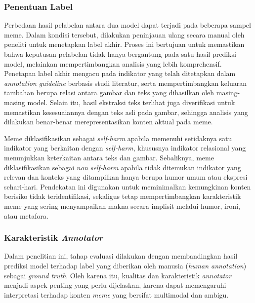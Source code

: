\subsubsection{Penentuan Label} \label{subsubsec:penentuan_label}
Perbedaan hasil pelabelan antara dua model dapat terjadi pada beberapa sampel meme. Dalam kondisi tersebut, dilakukan peninjauan ulang secara manual oleh peneliti untuk menetapkan label akhir. Proses ini bertujuan untuk memastikan bahwa keputusan pelabelan tidak hanya bergantung pada satu hasil prediksi model, melainkan mempertimbangkan analisis yang lebih komprehensif. Penetapan label akhir mengacu pada indikator yang telah ditetapkan dalam \textit{annotation guideline} berbasis studi literatur, serta mempertimbangkan keluaran tambahan berupa relasi antara gambar dan teks yang dihasilkan oleh masing-masing model. Selain itu, hasil ekstraksi teks terlihat juga diverifikasi untuk memastikan kesesuaiannya dengan teks asli pada gambar, sehingga analisis yang dilakukan benar-benar merepresentasikan konten aktual pada meme.

Meme diklasifikasikan sebagai \textit{self-harm} apabila memenuhi setidaknya satu indikator yang berkaitan dengan \textit{self-harm}, khususnya indikator relasional yang menunjukkan keterkaitan antara teks dan gambar. Sebaliknya, meme diklasifikasikan sebagai \textit{non self-harm} apabila tidak ditemukan indikator yang relevan dan konteks yang ditampilkan hanya berupa humor umum atau ekspresi sehari-hari. Pendekatan ini digunakan untuk meminimalkan kemungkinan konten berisiko tidak teridentifikasi, sekaligus tetap mempertimbangkan karakteristik meme yang sering menyampaikan makna secara implisit melalui humor, ironi, atau metafora.


\subsubsection{Karakteristik \textit{Annotator}} \label{subsubsec:karakteristik_annotator}
Dalam penelitian ini, tahap evaluasi dilakukan dengan membandingkan hasil prediksi model terhadap label yang diberikan oleh manusia (\textit{human annotation}) sebagai \textit{ground truth}. Oleh karena itu, kualitas dan karakteristik \textit{annotator} menjadi aspek penting yang perlu dijelaskan, karena dapat memengaruhi interpretasi terhadap konten \textit{meme} yang bersifat multimodal dan ambigu.

